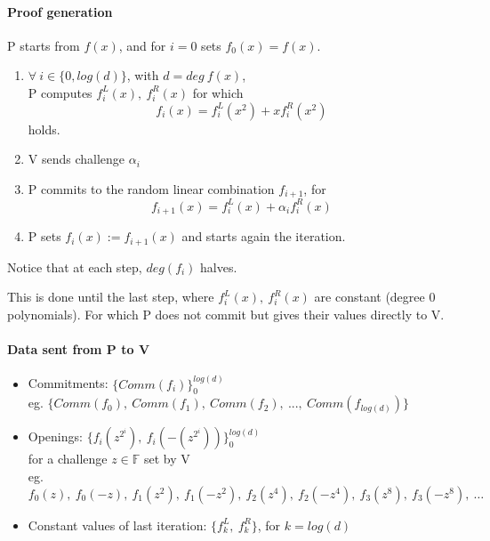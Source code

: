 \documentclass{article}
\theoremstyle{definition}
\begin{document}
\vspace{30px}

\paragraph{Proof generation}
P starts from $f(x)$, and for $i=0$ sets $f_0(x)=f(x)$.

\begin{enumerate}
	\item $\forall~i \in \{0, log(d)\}$, with $d = deg~f(x)$,\\
		P computes $f_i^L(x),~ f_i^R(x)$ for which
		\begin{equation}\tag{eq. $A_i$}
			f_i(x) = f_i^L(x^2) + x f_i^R(x^2)
		\end{equation}
		holds.
	\item V sends challenge $\alpha_i$
	\item P commits to the random linear combination $f_{i+1}$, for
		\begin{equation}\tag{eq. $B_i$}
		f_{i+1}(x) = f_i^L(x) + \alpha_i f_i^R(x)
	\end{equation}
	\item P sets $f_i(x) := f_{i+1}(x)$ and starts again the iteration.
\end{enumerate}
Notice that at each step, $deg(f_i)$ halves.

This is done until the last step, where $f_i^L(x),~ f_i^R(x)$ are constant (degree 0 polynomials). For which P does not commit but gives their values directly to V.

\paragraph{Data sent from P to V}
\begin{itemize}
	\item[] Commitments: $\{Comm(f_i)\}_0^{log(d)}$\\
		{\scriptsize eg. $\{Comm(f_0),~ Comm(f_1),~ Comm(f_2),~ ...,~ Comm(f_{log(d)})\}$ }
	\item[] Openings: $\{ f_i(z^{2^i}),~f_i(-(z^{2^i})) \}_0^{log(d)}$\\
		for a challenge $z \in \mathbb{F}$ set by V\\
		{\scriptsize eg. $f_0(z),~ f_0(-z),~ f_1(z^2),~ f_1(-z^2),~ f_2(z^4),~ f_2(-z^4),~ f_3(z^8),~ f_3(-z^8),~ \ldots$}
	\item[] Constant values of last iteration: $\{f_k^L,~f_k^R\}$, for $k=log(d)$
\end{itemize}
\end{document}
